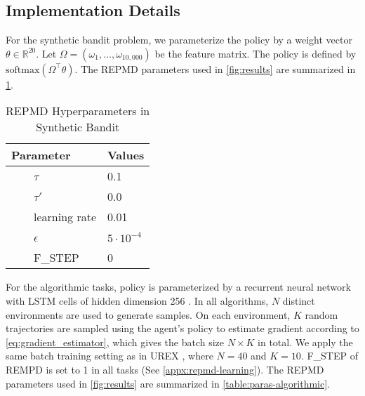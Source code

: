 \subsection{Implementation Details}
\label{subsec:implementation}
For the synthetic bandit problem, we parameterize the policy by a weight vector $\theta\in  \mathbb{R}^{20}$. Let $\Omega = \left( \omega_1, \dots, \omega_{10,000} \right)$ be the feature matrix. The policy is defined by $\text{softmax}(\Omega^{\top}\theta)$. The REPMD parameters used in \cref{fig:results} are summarized in \cref{table:paras-bandit}. 
\begin{table}[ht]
\caption{REPMD Hyperparameters in Synthetic Bandit} %
\centering 
\begin{tabular}{l l} 
\hline
Parameter & Values \\ [0.5ex] %
\hline %
\ \ \ \ $\tau$ & 0.1  \\
\ \ \ \ $\tau'$ & 0.0 \\
\ \ \ \ learning rate & 0.01 \\
\ \ \ \ $\epsilon $ & $5\cdot 10^{-4}$ \\
\ \ \ \ F\_STEP & 0 \\
\hline
\end{tabular}
\label{table:paras-bandit} %
\end{table}


For the algorithmic tasks, policy is parameterized by a recurrent neural network with LSTM cells of hidden dimension 256 \citep{hochreiter1997long}. In all algorithms, $N$ distinct environments are used to generate samples. On each environment, $K$ random trajectories are sampled using the agent's policy to estimate gradient according to \cref{eq:gradient_estimator}, which gives the batch size $N\times K$ in total. We apply the same batch training setting as in UREX \citep{nachum2017improving}, where $N=40$ and $K=10$. F\_STEP of REMPD is set to 1 in all tasks (See \cref{appx:repmd-learning}). The REPMD parameters used in \cref{fig:results} are summarized in \cref{table:paras-algorithmic}. 

